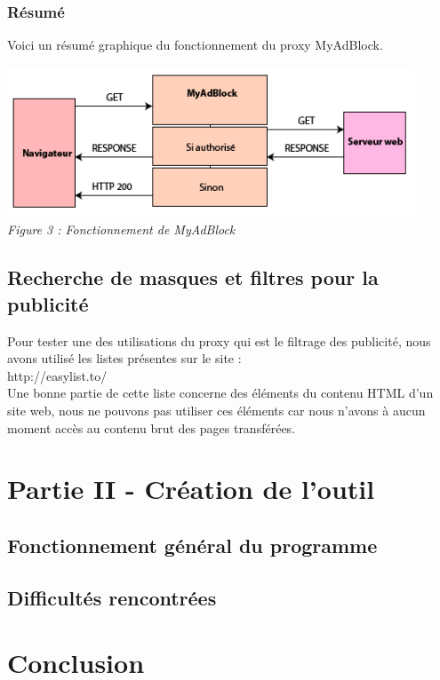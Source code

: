 \documentclass{scrreprt}
\begin{document}
\subsection{Résumé}
Voici un résumé graphique du fonctionnement du proxy MyAdBlock.

\begin{center}
  \includegraphics[height=4.5cm]{images/f3.png}
  \\
  \textit{Figure 3 : Fonctionnement de MyAdBlock}
\end{center}


\section{Recherche de masques et filtres pour la publicité}
Pour tester une des utilisations du proxy qui est le filtrage des publicité, nous avons utilisé les listes présentes sur le site :\\
http://easylist.to/\\
Une bonne partie de cette liste concerne des éléments du contenu HTML d'un site web, nous ne pouvons pas utiliser ces éléments car nous n'avons à aucun moment accès au contenu brut des pages transférées.

\chapter{Partie II - Création de l'outil}

\section{Fonctionnement général du programme}

\section{Difficultés rencontrées}


\chapter{Conclusion}
\end{document}
